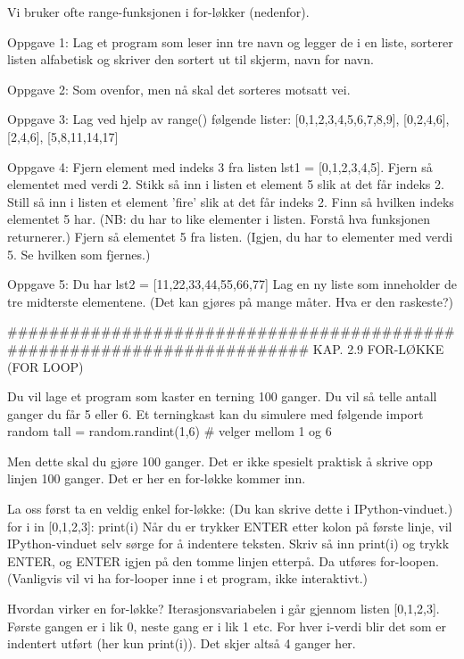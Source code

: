 \documentclass[a4paper,11pt,utf8]{book}
\begin{document}
Vi bruker ofte range-funksjonen i for-løkker (nedenfor). 




Oppgave 1: Lag et program som leser inn tre navn og legger de i en liste,
sorterer listen alfabetisk og skriver den sortert ut til skjerm, navn for navn. 


Oppgave 2: Som ovenfor, men nå skal det sorteres motsatt vei. 


Oppgave 3: Lag ved hjelp av range() følgende lister:
[0,1,2,3,4,5,6,7,8,9], [0,2,4,6], [2,4,6], [5,8,11,14,17] 


Oppgave 4: Fjern element med indeks 3 fra listen lst1 = [0,1,2,3,4,5].
Fjern så elementet med verdi 2.
Stikk så inn i listen et element 5 slik at det får indeks 2.
Still så inn i listen et element 'fire' slik at det får indeks 2.
Finn så hvilken indeks elementet 5 har.
(NB: du har to like elementer i listen. Forstå hva funksjonen returnerer.)
Fjern så elementet 5 fra listen.
(Igjen, du har to elementer med verdi 5. Se hvilken som fjernes.) 


Oppgave 5: Du har lst2 = [11,22,33,44,55,66,77]
Lag en ny liste som inneholder de tre midterste elementene.
(Det kan gjøres på mange måter. Hva er den raskeste?)




######################################################################## 
KAP. 2.9  FOR-LØKKE (FOR LOOP)

Du vil lage et program som kaster en terning 100 ganger.
Du vil så telle antall ganger du får 5 eller 6. 
Et terningkast kan du simulere med følgende 
import random
tall = random.randint(1,6)   # velger mellom 1 og 6

Men dette skal du gjøre 100 ganger.
Det er ikke spesielt praktisk å skrive opp linjen 100 ganger.
Det er her en for-løkke kommer inn. 

La oss først ta en veldig enkel for-løkke:
(Du kan skrive dette i IPython-vinduet.) 
for i in [0,1,2,3]:
    print(i)
Når du er trykker ENTER etter kolon på første linje,
vil IPython-vinduet selv sørge for å indentere teksten.
Skriv så inn print(i) og trykk ENTER, og ENTER igjen på den tomme linjen etterpå.
Da utføres for-loopen.
(Vanligvis vil vi ha for-looper inne i et program, ikke interaktivt.) 

Hvordan virker en for-løkke?
Iterasjonsvariabelen i går gjennom listen [0,1,2,3]. 
Første gangen er i lik 0, neste gang er i lik 1 etc.
For hver i-verdi blir det som er indentert utført (her kun print(i)).
Det skjer altså 4 ganger her. 
\end{document}
